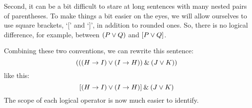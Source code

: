Second, it can be a bit difficult to stare at long sentences with many nested pairs of parentheses. To make things a bit easier on the eyes, we will allow ourselves to use square brackets, `[' and `]', in addition to rounded ones. So, there is no logical difference, for example, between $(P\vee Q)$ and $[P\vee Q]$. 

Combining these two conventions, we can rewrite this sentence:
$$(((H \rightarrow I) \vee (I \rightarrow H)) \mathbin{\&} (J \vee K))$$
like this:
$$[(H \rightarrow I) \vee (I \rightarrow H)] \mathbin{\&} (J \vee K)$$
The scope of each logical operator is now much easier to identify.




